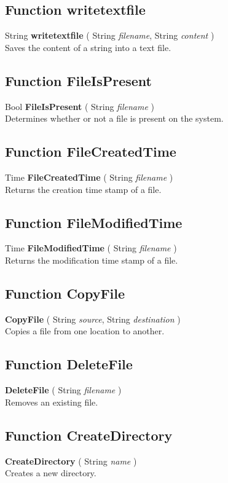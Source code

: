 \documentclass[10pt]{book}
\begin{document}
\subsection{Function writetextfile \label{F:writetextfile}}
String \textbf{writetextfile} ( String \textit{filename}, String \textit{content} ) \\
Saves the content of a string into a text file.

\subsection{Function FileIsPresent \label{F:FileIsPresent}}
Bool \textbf{FileIsPresent} ( String \textit{filename} ) \\
Determines whether or not a file is present on the system.

\subsection{Function FileCreatedTime \label{F:FileCreatedTime}}
Time \textbf{FileCreatedTime} ( String \textit{filename} ) \\
Returns the creation time stamp of a file.

\subsection{Function FileModifiedTime \label{F:FileModifiedTime}}
Time \textbf{FileModifiedTime} ( String \textit{filename} ) \\
Returns the modification time stamp of a file.

\subsection{Function CopyFile \label{F:CopyFile}}
\textbf{CopyFile} ( String \textit{source}, String \textit{destination} ) \\
Copies a file from one location to another.

\subsection{Function DeleteFile \label{F:DeleteFile}}
\textbf{DeleteFile} ( String \textit{filename} ) \\
Removes an existing file.

\subsection{Function CreateDirectory \label{F:CreateDirectory}}
\textbf{CreateDirectory} ( String \textit{name} ) \\
Creates a new directory.
\end{document}
